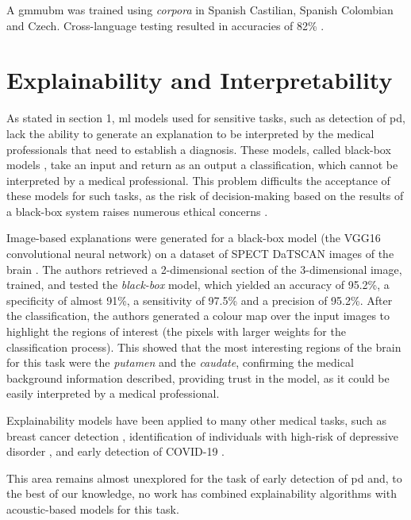 A \gls{gmmubm} was trained using \textit{corpora} in Spanish Castilian, Spanish Colombian and Czech. Cross-language testing resulted in accuracies of 82\% \cite{parkinson_phonemic_relevance}. 

  

\section{Explainability and Interpretability}

As stated in section 1, \gls{ml} models used for sensitive tasks, such as detection of \gls{pd}, lack the ability to generate an explanation to be interpreted by the medical professionals that need to establish a diagnosis. These models, called black-box models \cite{explainable_ai_systems}, take an input and return as an output a classification, which cannot be interpreted by a medical professional. This problem difficults the acceptance of these models for such tasks, as the risk of decision-making based on the results of a black-box system raises numerous ethical concerns \cite{ethical_black_box_decision}.

Image-based explanations were generated for a black-box model (the VGG16 convolutional neural network) on a dataset of SPECT DaTSCAN images of the brain \cite{LIME_explainability}. The authors retrieved a 2-dimensional section of the 3-dimensional image, trained, and tested the \textit{black-box} model, which yielded an accuracy of 95.2\%, a specificity of almost 91\%, a sensitivity of 97.5\% and a precision of 95.2\%. After the classification, the authors generated a colour map over the input images to highlight the regions of interest (the pixels with larger weights for the classification process). This showed that the most interesting regions of the brain for this task were the \textit{putamen} and the \textit{caudate}, confirming the medical background information described, providing trust in the model, as it could be easily interpreted by a medical professional.

Explainability models have been applied to many other medical tasks, such as breast cancer detection \cite{lime_breast_cancer}, identification of individuals with high-risk of depressive disorder \cite{lime_depression}, and early detection of COVID-19 \cite{lime_covid}. 

This area remains almost unexplored for the task of early detection of \gls{pd} and, to the best of our knowledge, no work has combined explainability algorithms with acoustic-based models for this task.


